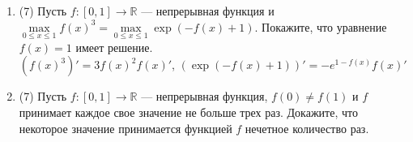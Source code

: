 \documentclass[a4paper]{article}
\begin{document}
\begin{enumerate}
\item (7) Пусть $f:[0,1]\to \mathbb R$ --- непрерывная функция и $\max\limits_{0\leq x\leq 1}f(x)^3 = \max\limits_{0\leq x\leq 1}\exp(-f(x) + 1)$. Покажите, что уравнение $f(x) = 1$ имеет решение.\\
$(f(x)^3)' = 3f(x)^2f(x)'$, $(\exp(-f(x) + 1))' = -e^{1-f(x)}f(x)'$

\item (7) Пусть  $f:[0,1]\to \mathbb R$ --- непрерывная функция, $f(0)\neq f(1)$ и $f$ принимает каждое свое значение не больше трех раз. Докажите, что некоторое значение принимается функцией $f$ нечетное количество раз.
    
    
    
\end{enumerate}
\end{document}
